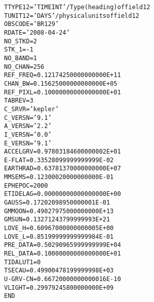 \documentclass[twoside]{article}
\begin{document}
\begin{alltt}
TTYPE12 = 'TIME INT        '   / Type (heading) of field 12
TUNIT12 = 'DAYS    '           / physical units of field 12
OBSCODE = 'BR129   '
RDATE   = '2008-04-24'
NO_STKD =            2
STK_1   =           -1
NO_BAND =            1
NO_CHAN =          256
REF_FREQ=   0.12174250000000000E+11
CHAN_BW =   0.15625000000000000E+05
REF_PIXL=   0.10000000000000000E+01
TABREV  =            3
C_SRVR  = 'kepler  '
C_VERSN = '9.1     '
A_VERSN = '2.2     '
I_VERSN = '0.0     '
E_VERSN = '9.1     '
ACCELGRV=   0.97803184600000002E+01
E-FLAT  =   0.33528099999999999E-02
EARTHRAD=   0.63781370000000000E+07
MMSEMS  =   0.12300020000000000E-01
EPHEPOC =         2000
ETIDELAG=   0.00000000000000000E+00
GAUSS   =   0.17202098950000001E-01
GMMOON  =   0.49027975000000000E+13
GMSUN   =   0.13271243799999993E+21
LOVE_H  =   0.60967000000000005E+00
LOVE_L  =   0.85199999999999984E-01
PRE_DATA=   0.50290965999999999E+04
REL_DATA=   0.10000000000000000E+01
TIDALUT1=            0
TSECAU  =   0.49900478199999998E+03
U-GRV-CN=   0.66720000000000016E-10
VLIGHT  =   0.29979245800000000E+09
END
\end{alltt}
\end{document}
